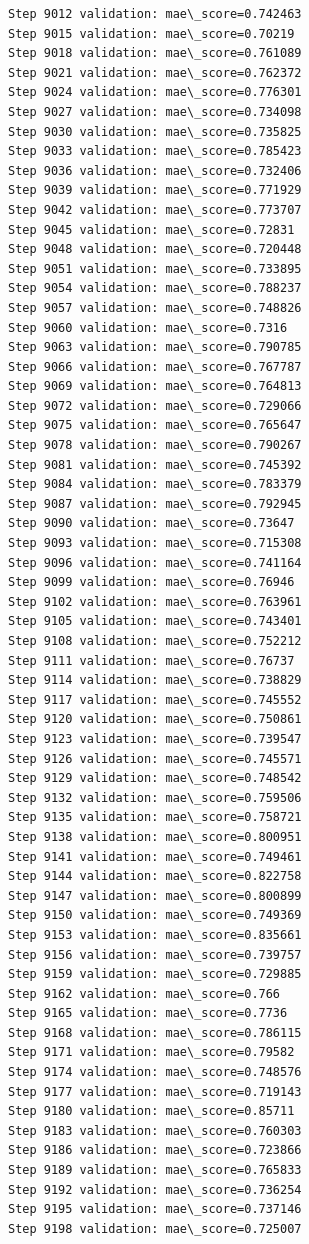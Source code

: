 \documentclass[11pt]{article}
\begin{document}
\begin{Verbatim}[commandchars=\\\{\}]
Step 9012 validation: mae\_score=0.742463
Step 9015 validation: mae\_score=0.70219
Step 9018 validation: mae\_score=0.761089
Step 9021 validation: mae\_score=0.762372
Step 9024 validation: mae\_score=0.776301
Step 9027 validation: mae\_score=0.734098
Step 9030 validation: mae\_score=0.735825
Step 9033 validation: mae\_score=0.785423
Step 9036 validation: mae\_score=0.732406
Step 9039 validation: mae\_score=0.771929
Step 9042 validation: mae\_score=0.773707
Step 9045 validation: mae\_score=0.72831
Step 9048 validation: mae\_score=0.720448
Step 9051 validation: mae\_score=0.733895
Step 9054 validation: mae\_score=0.788237
Step 9057 validation: mae\_score=0.748826
Step 9060 validation: mae\_score=0.7316
Step 9063 validation: mae\_score=0.790785
Step 9066 validation: mae\_score=0.767787
Step 9069 validation: mae\_score=0.764813
Step 9072 validation: mae\_score=0.729066
Step 9075 validation: mae\_score=0.765647
Step 9078 validation: mae\_score=0.790267
Step 9081 validation: mae\_score=0.745392
Step 9084 validation: mae\_score=0.783379
Step 9087 validation: mae\_score=0.792945
Step 9090 validation: mae\_score=0.73647
Step 9093 validation: mae\_score=0.715308
Step 9096 validation: mae\_score=0.741164
Step 9099 validation: mae\_score=0.76946
Step 9102 validation: mae\_score=0.763961
Step 9105 validation: mae\_score=0.743401
Step 9108 validation: mae\_score=0.752212
Step 9111 validation: mae\_score=0.76737
Step 9114 validation: mae\_score=0.738829
Step 9117 validation: mae\_score=0.745552
Step 9120 validation: mae\_score=0.750861
Step 9123 validation: mae\_score=0.739547
Step 9126 validation: mae\_score=0.745571
Step 9129 validation: mae\_score=0.748542
Step 9132 validation: mae\_score=0.759506
Step 9135 validation: mae\_score=0.758721
Step 9138 validation: mae\_score=0.800951
Step 9141 validation: mae\_score=0.749461
Step 9144 validation: mae\_score=0.822758
Step 9147 validation: mae\_score=0.800899
Step 9150 validation: mae\_score=0.749369
Step 9153 validation: mae\_score=0.835661
Step 9156 validation: mae\_score=0.739757
Step 9159 validation: mae\_score=0.729885
Step 9162 validation: mae\_score=0.766
Step 9165 validation: mae\_score=0.7736
Step 9168 validation: mae\_score=0.786115
Step 9171 validation: mae\_score=0.79582
Step 9174 validation: mae\_score=0.748576
Step 9177 validation: mae\_score=0.719143
Step 9180 validation: mae\_score=0.85711
Step 9183 validation: mae\_score=0.760303
Step 9186 validation: mae\_score=0.723866
Step 9189 validation: mae\_score=0.765833
Step 9192 validation: mae\_score=0.736254
Step 9195 validation: mae\_score=0.737146
Step 9198 validation: mae\_score=0.725007

\end{Verbatim}
\end{document}
